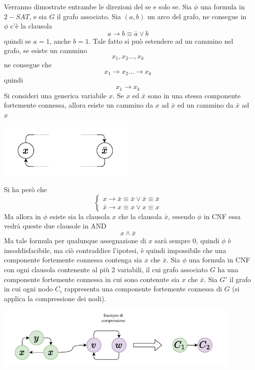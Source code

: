 \documentclass[10pt, letterpaper]{report}
\begin{document}
\dimo{} Verranno dimostrate entrambe le direzioni del se e solo se. \acc 
\boxedMath{$\implies$} Sia $\phi$ una formula in $2-SAT$, e sia $G$ il grafo associato. Sia $(a,b)$ un arco del grafo, ne consegue in $\phi$ c'è la clausola 
$$ a\rightarrow b \equiv \bar a \lor b$$
quindi se $a=1$, anche $b=1$. Tale fatto si può estendere ad un cammino nel grafo, se esiste un cammino 
$$ x_1,x_2\dots , x_k$$
ne consegue che 
$$ x_1\rightarrow x_2 \dots \rightarrow x_k$$
quindi 
$$ x_1 \rightarrow x_k$$
Si consideri una generica variabile $x$. Se $x$ ed $\bar x$ sono in una stessa componente fortemente connessa, allora esiste un cammino da $x$ ad $\bar x$ ed un cammino da $\bar x$ ad $x$\begin{center}
    \includegraphics[width=0.5\textwidth ]{images/dimoGrafo.pdf}
\end{center}
Si ha però che 
$$ \begin{cases}
    x\rightarrow \bar x \equiv \bar x \lor \bar x\equiv \bar x   \\ 
    \bar x \rightarrow x \equiv x \lor x\equiv x 
\end{cases}$$
Ma allora in $\phi$ esiste sia la clausola $x$ che la clausola $\bar x$, essendo $\phi$ in CNF essa vedrà queste due clausole in AND 
$$ x \land \bar x $$
Ma tale formula per qualunque assegnazione di $x$ sarà sempre 0, quindi $\phi$ è insoddisfacibile, ma ciò contraddice l'ipotesi, è quindi impossibile che una componente fortemente connessa contenga sia $x$ che $\bar x$. \acc  
\boxedMath{$\impliedby$} Sia $\phi$ una formula in CNF con ogni clausola contenente al più 2 variabili, il cui grafo associato $G$ ha una componente fortemente connessa in cui sono contenute sia $x$ che $\bar x$. Sia $G'$ il grafo in cui ogni nodo $C_i$ rappresenta una componente fortemente connessa di $G$ (si applica la compressione dei nodi).
\begin{center}
    \includegraphics[width=0.9\textwidth ]{images/compressione.pdf}
\end{center}
\end{document}

